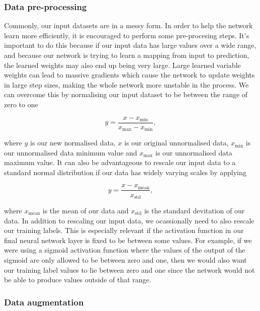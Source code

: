 \subsubsection{Data pre-processing}
Commonly, our input datasets are in a messy form. In order to help the network learn more efficiently, it is encouraged to perform some pre-procesing steps. It's important to do this because if our input data has large values over a wide range, and because our network is trying to learn a mapping from input to prediction, the learned weights may also end up being very large. Large learned variable weights can lead to massive gradients which cause the network to update weights in large step sizes, making the whole network more unstable in the process. We can overcome this by normalising our input dataset to be between the range of zero to one 

\begin{equation}
    y = \frac{x - x_{\textrm{min}}}{x_{\textrm{max}}-x_{\textrm{min}}},
\end{equation}

where $y$ is our new normalised data, $x$ is our original unnormalised data, $x_{\textrm{min}}$ is our unnormalised data minimum value and $x_{\textrm{max}}$ is our unnormalised data maximum value. It can also be advantageous to rescale our input data to a standard normal distribution if our data has widely varying scales by applying 

\begin{equation}
    y = \frac{x - x_{\textrm{mean}}}{x_{\textrm{std}}},
\end{equation}

where $x_{\textrm{mean}}$ is the mean of our data and $x_{\textrm{std}}$ is the standard devitation of our data. In addition to rescaling our input data, we ocassionally need to also rescale our training labels. This is especially relevant if the activation function in our final neural network layer is fixed to be between some values. For example, if we were using a sigmoid activation function where the values of the output of the sigmoid are only allowed to be between zero and one, then we would also want our training label values to lie between zero and one since the network would not be able to produce values outside of that range.

\subsubsection{Data augmentation}

